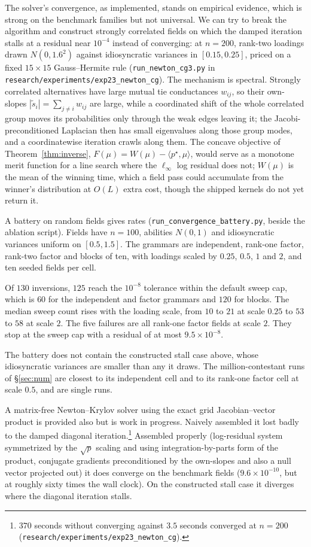 \documentclass[11pt]{article}
\begin{document}
The solver's convergence, as implemented, stands on empirical evidence, which is strong on the
benchmark families but not universal. We can try to break the algorithm and construct strongly
correlated fields on which the damped iteration stalls at a residual
near $10^{-4}$ instead of converging: at $n=200$, rank-two loadings drawn
$N(0,1.6^2)$ against idiosyncratic variances in $[0.15,0.25]$, priced on
a fixed $15\times15$ Gauss--Hermite rule (\texttt{run\_newton\_cg3.py} in
\texttt{research/experiments/exp23\_newton\_cg}).
The mechanism is spectral. Strongly correlated alternatives have large
mutual tie conductances $w_{ij}$, so their own-slopes
$|\tilde s_i|=\sum_{j\ne i}w_{ij}$ are large, while a coordinated shift of
the whole correlated group moves its probabilities only through the weak
edges leaving it; the Jacobi-preconditioned Laplacian then has small
eigenvalues along those group modes, and a coordinatewise iteration
crawls along them. The concave objective of Theorem~\ref{thm:inverse},
$F(\mu)=W(\mu)-\langle p^{\star},\mu\rangle$, would serve as a monotone
merit function for a line search where the $\ell_\infty$ log residual
does not; $W(\mu)$ is the mean of the winning time, which a field pass
could accumulate from the winner's distribution at $O(L)$ extra cost,
though the shipped kernels do not yet return it.

A battery on random fields gives rates
(\texttt{run\_convergence\_battery.py}, beside the ablation script).
Fields have $n=100$, abilities $N(0,1)$ and idiosyncratic variances
uniform on $[0.5,1.5]$. The grammars are independent, rank-one factor,
rank-two factor and blocks of ten, with loadings scaled by $0.25$,
$0.5$, $1$ and $2$, and ten seeded fields per cell.

Of $130$ inversions, $125$ reach the $10^{-8}$ tolerance within the
default sweep cap, which is $60$ for the independent and factor grammars
and $120$ for blocks. The median sweep count rises with the loading
scale, from $10$ to $21$ at scale $0.25$ to $53$ to $58$ at scale $2$.
The five failures are all rank-one factor fields at scale $2$. They stop
at the sweep cap with a residual of at most $9.5\times10^{-8}$.

The battery does not contain the constructed stall case above, whose
idiosyncratic variances are smaller than any it draws. The
million-contestant runs of \S\ref{sec:num} are closest to its independent
cell and to its rank-one factor cell at scale $0.5$, and are single runs.

A matrix-free Newton--Krylov solver using the exact grid Jacobian--vector product is
provided also but is work in progress. Naively assembled it lost badly to the damped diagonal iteration.\footnote{
$370$ seconds without converging against $3.5$ seconds converged at
$n=200$ (\texttt{research/experiments/exp23\_newton\_cg}).} Assembled properly (log-residual system symmetrized by the
$\sqrt{p}$ scaling and using integration-by-parts form of the product,
conjugate gradients preconditioned by the own-slopes and also a null vector
projected out) it
does converge on the benchmark fields ($9.6\times10^{-10}$, but at roughly
sixty times the wall clock). On the constructed stall case it
diverges where the diagonal iteration stalls.
\end{document}
